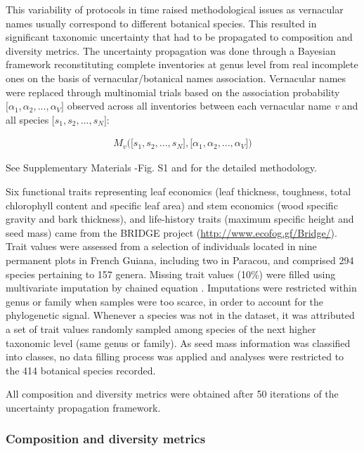 \documentclass[
  11pt,
  french,
  A4paper,
  extrafontsizes,onecolumn,openright
  ]{memoir}
\begin{document}
This variability of protocols in time raised methodological issues as
vernacular names usually correspond to different botanical species. This
resulted in significant taxonomic uncertainty that had to be propagated
to composition and diversity metrics. The uncertainty propagation was
done through a Bayesian framework reconstituting complete inventories at
genus level from real incomplete ones on the basis of
vernacular/botanical names association. Vernacular names were replaced
through multinomial trials based on the association probability
\(\big[\alpha_1, \alpha_2,..., \alpha_V\big]\) observed across all
inventories between each vernacular name \emph{v} and all species
\(\big[s_1, s_2,..., s_N\big]\):

\begin{align}
M_v\Big(\big[s_1, s_2,..., s_N\big],\big[\alpha_1, \alpha_2,..., \alpha_V\big]\Big) \nonumber
\end{align}

See Supplementary Materials -Fig. S1 and \textcite{Aubry-Kientz2013} for
the detailed methodology.

Six functional traits representing leaf economics (leaf thickness,
toughness, total chlorophyll content and specific leaf area) and stem
economics (wood specific gravity and bark thickness), and life-history
traits (maximum specific height and seed mass) came from the BRIDGE
project (\url{http://www.ecofog.gf/Bridge/}). Trait values were assessed
from a selection of individuals located in nine permanent plots in
French Guiana, including two in Paracou, and comprised 294 species
pertaining to 157 genera. Missing trait values (10\%) were filled using
multivariate imputation by chained equation \autocite{Mice2011}.
Imputations were restricted within genus or family when samples were too
scarce, in order to account for the phylogenetic signal. Whenever a
species was not in the dataset, it was attributed a set of trait values
randomly sampled among species of the next higher taxonomic level (same
genus or family). As seed mass information was classified into classes,
no data filling process was applied and analyses were restricted to the
414 botanical species recorded.

All composition and diversity metrics were obtained after 50 iterations
of the uncertainty propagation framework.

\subsubsection{Composition and diversity
metrics}\label{composition-and-diversity-metrics}
\end{document}
